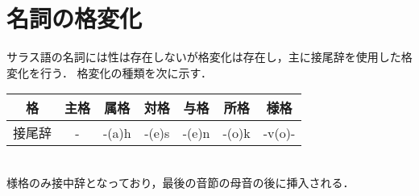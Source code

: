 \documentclass[uplatex]{jsarticle}
\begin{document}
\section{名詞の格変化}
\label{noum_case}
サラス語の名詞には性は存在しないが格変化は存在し，主に接尾辞を使用した格変化を行う．
格変化の種類を次に示す．
\begin{table}[htbp]
 \begin{center}
  \begin{tabular}[tb]{|c|c|c|c|c|c|c|} \hline
   格     & 主格 & 属格  & 対格  & 与格  & 所格  & 様格   \\ \hline \hline 
   接尾辞 & -    & -(a)h & -(e)s & -(e)n & -(o)k & -v(o)- \\ \hline
  \end{tabular}
 \end{center}
\end{table} \\
様格のみ接中辞となっており，最後の音節の母音の後に挿入される．
\end{document}
